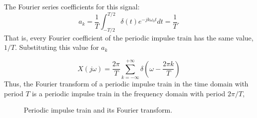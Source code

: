 \begin{frame}
    {
        The Fourier series coefficients for this signal:
        \begin{equation*}
            a_k = \frac{1}{T}\int_{-T/2}^{T/2} \delta(t)e^{-jk\omega_0 t}dt = \frac{1}{T}.
        \end{equation*}
        That is, every Fourier coefficient of the periodic impulse train has the same value, $1/T$. Substituting this value for $a_k$
    \pause
    \pause
        \begin{equation*}
            X(j\omega) = \frac{2\pi}{T} \sum_{k=-\infty}^{+\infty}\delta\left(\omega - \frac{2\pi k}{T}\right)
        \end{equation*}
    \pause
    Thus, the Fourier transform of a periodic impulse train in the time domain with period $T$ is a periodic impulse train in the frequency domain with period $2\pi/T$,
    }
\end{frame}

\begin{frame}
    \begin{figure}
        \centering
        
        \caption{Periodic impulse train and its Fourier transform.}\label{fi:ft_pulse_train}
    \end{figure}
\end{frame}



